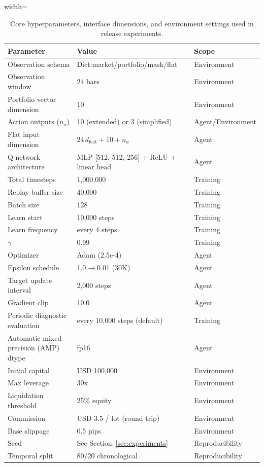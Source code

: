 \begin{table}[!tbp]
\centering
\caption{Core hyperparameters, interface dimensions, and environment settings used in release experiments.}
\label{tab:hyperparams}

\begin{adjustbox}{width=\linewidth}
\begin{tabularx}{\linewidth}{@{}lXl@{}}
\toprule
\textbf{Parameter} & \textbf{Value} & \textbf{Scope} \\
\midrule
Observation schema & Dict:\;market/portfolio/mask/flat & Environment \\
Observation window & 24 bars & Environment \\
Portfolio vector dimension & 10 & Environment \\
Action outputs ($n_a$) & 10 (extended) or 3 (simplified) & Agent/Environment \\
Flat input dimension & $24\,d_{\mathrm{feat}} + 10 + n_a$ & Agent \\
Q-network architecture & MLP [512, 512, 256] + ReLU + linear head & Agent \\
Total timesteps & 1,000,000 & Training \\
Replay buffer size & 40,000 & Training \\
Batch size & 128 & Training \\
Learn start & 10,000 steps & Training \\
Learn frequency & every 4 steps & Training \\
$\gamma$ & 0.99 & Training \\
Optimizer & Adam (2.5e-4) & Agent \\
Epsilon schedule & 1.0$\rightarrow$0.01 (30K) & Agent \\
Target update interval & 2,000 steps & Agent \\
Gradient clip & 10.0 & Agent \\
Periodic diagnostic evaluation & every 10,000 steps (default) & Training \\
Automatic mixed precision (AMP) dtype & fp16 & Agent \\
Initial capital & USD 100,000 & Environment \\
Max leverage & 30x & Environment \\
Liquidation threshold & 25\% equity & Environment \\
Commission & USD 3.5 / lot (round trip) & Environment \\
Base slippage & 0.5 pips & Environment \\
Seed & See Section~\ref{sec:experiments} & Reproducibility \\
Temporal split & 80/20 chronological & Reproducibility \\
\bottomrule
\end{tabularx}
\end{adjustbox}
\end{table}


